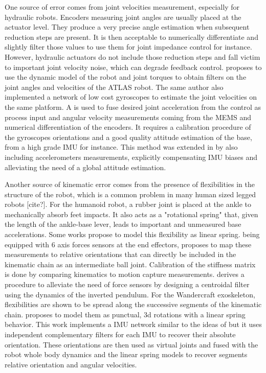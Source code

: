 One source of error comes from joint velocities measurement, especially for hydraulic robots. Encoders measuring joint angles are usually placed 
at the actuator level. They produce a very precise angle estimation when subsequent reduction steps are present. It is then acceptable to numerically 
differentiate and slightly filter those values to use them for joint impedance control for instance. However, hydraulic
actuators do not include those reduction steps and fall victim to important joint velocity noise, which can degrade feedback control.
\cite{xinjilefu2014decoupled} proposes to use the dynamic model of the robot and joint torques to obtain filters on the joint angles and velocities
of the ATLAS robot. The same author \cite{xinjilefu2016distributed} also implemented a network of low cost gyroscopes to estimate the joint velocities 
on the same platform. A \KalmanF is used to fuse desired joint acceleration from the control as process input and angular velocity measurements coming from 
the MEMS and numerical differentiation of the encoders. It requires a calibration procedure of the gyroscopes orientations and a good quality attitude
estimation of the base, from a high grade IMU for instance. This method was extended in \cite{rotella2016imu} by also including
accelerometers measurements, explicitly compensating IMU biases and alleviating the need of a global attitude estimation.

Another source of kinematic error comes from the presence of flexibilities in the structure of the robot, which is a common problem in many human sized legged robots [cite?]. 
For the  humanoid robot, a rubber joint is placed at the ankle to mechanically absorb feet impacts. 
It also acts as a "rotational spring" that, given the length of the ankle-base lever, 
leads to important and unmeasured base accelerations. Some works propose to model this flexibility as linear spring.  being equipped with 6 axis 
forces sensors at the end effectors, \cite{flayols2017experimental} proposes to map these measurements to relative orientations that can 
directly be included in the kinematic chain as an intermediate ball joint. Calibration of the stiffness matrix is done by comparing 
kinematics to motion capture measurements. \cite{benallegue2015estimation} derives a procedure to alleviate the need of force sensors by 
designing a centroidal filter using the dynamics of the inverted pendulum. For the Wandercraft exoskeleton, flexibilities
are shown to be spread along the successive segments of the kinematic chain. \cite{vigne2018estimation} proposes to model them as punctual, 
3d rotations with a linear spring behavior. This work implements a IMU network similar to the ideas of \cite{xinjilefu2016distributed,rotella2016imu} 
but it uses independent complementary filters for each IMU to recover their absolute orientation. These orientations are then used as 
virtual joints and fused with the robot whole body dynamics and the linear spring models to recover segments relative orientation and angular velocities.

